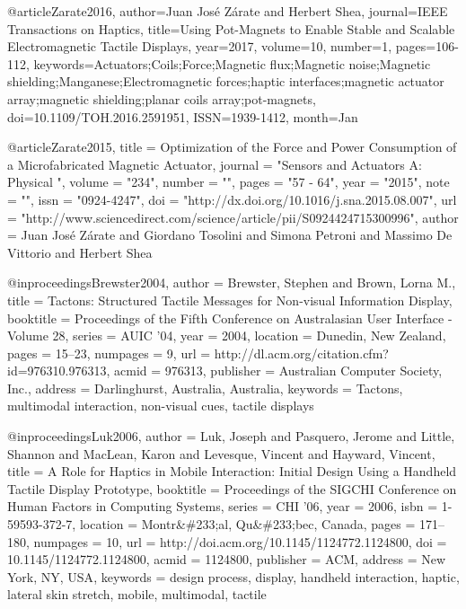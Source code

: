 @article{Zarate2016, 
author={Juan Jos\'e Z\'arate and  Herbert Shea}, 
journal={IEEE Transactions on Haptics}, 
title={{Using Pot-Magnets to Enable Stable and Scalable Electromagnetic Tactile Displays}}, 
year={2017}, 
volume={10}, 
number={1}, 
pages={106-112}, 
keywords={Actuators;Coils;Force;Magnetic flux;Magnetic noise;Magnetic shielding;Manganese;Electromagnetic forces;haptic interfaces;magnetic actuator array;magnetic shielding;planar coils array;pot-magnets}, 
doi={10.1109/TOH.2016.2591951}, 
ISSN={1939-1412}, 
month={Jan}
}

@article{Zarate2015,
title = {{Optimization of the Force and Power Consumption of a Microfabricated Magnetic Actuator}},
journal = "Sensors and Actuators A: Physical ",
volume = "234",
number = "",
pages = "57 - 64",
year = "2015",
note = "",
issn = "0924-4247",
doi = "http://dx.doi.org/10.1016/j.sna.2015.08.007",
url = "http://www.sciencedirect.com/science/article/pii/S0924424715300996",
author = {Juan Jos\'e Z\'arate and Giordano Tosolini and Simona Petroni and Massimo De Vittorio and Herbert Shea}
}


@inproceedings{Brewster2004,
 author = {Brewster, Stephen and Brown, Lorna M.},
 title = {{Tactons: Structured Tactile Messages for Non-visual Information Display}},
 booktitle = {Proceedings of the Fifth Conference on Australasian User Interface - Volume 28},
 series = {AUIC '04},
 year = {2004},
 location = {Dunedin, New Zealand},
 pages = {15--23},
 numpages = {9},
 url = {http://dl.acm.org/citation.cfm?id=976310.976313},
 acmid = {976313},
 publisher = {Australian Computer Society, Inc.},
 address = {Darlinghurst, Australia, Australia},
 keywords = {Tactons, multimodal interaction, non-visual cues, tactile displays}
} 

@inproceedings{Luk2006,
 author = {Luk, Joseph and Pasquero, Jerome and Little, Shannon and MacLean, Karon and Levesque, Vincent and Hayward, Vincent},
 title = {{A Role for Haptics in Mobile Interaction: Initial Design Using a Handheld Tactile Display Prototype}},
 booktitle = {Proceedings of the SIGCHI Conference on Human Factors in Computing Systems},
 series = {CHI '06},
 year = {2006},
 isbn = {1-59593-372-7},
 location = {Montr\&\#233;al, Qu\&\#233;bec, Canada},
 pages = {171--180},
 numpages = {10},
 url = {http://doi.acm.org/10.1145/1124772.1124800},
 doi = {10.1145/1124772.1124800},
 acmid = {1124800},
 publisher = {ACM},
 address = {New York, NY, USA},
 keywords = {design process, display, handheld interaction, haptic, lateral skin stretch, mobile, multimodal, tactile}
} 

